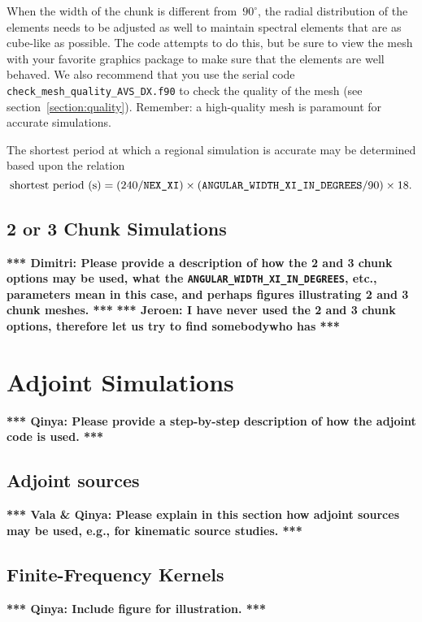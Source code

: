\documentclass[onecolumn]{article}
\newcommand{\tojeroen}[1]{\textbf{*** Jeroen: #1 ***}}
\newcommand{\tovalaqinya}[1]{\textbf{*** Vala \& Qinya: #1 ***}}
\newcommand{\toqinya}[1]{\textbf{*** Qinya: #1 ***}}
\newcommand{\todimitri}[1]{\textbf{*** Dimitri: #1 ***}}
\newcommand{\nexxi}{\mbox{\texttt{NEX\_XI}}}
\begin{document}
When the width of the chunk is different from~$90^\circ$, the radial
distribution of the elements needs to be adjusted as well to maintain
spectral elements that are as cube-like as possible. The code attempts
to do this, but be sure to view the mesh with your favorite graphics
package to make sure that the elements are well behaved.
We also recommend that you use the serial code
\texttt{check\_mesh\_quality\_AVS\_DX.f90} to check the quality of the mesh
(see section~\ref{section:quality}). Remember: a high-quality mesh
is paramount for accurate simulations.

The shortest period at which a regional simulation is accurate may be determined based
upon the relation
\begin{equation}
\mbox{shortest period (s)} = (240/\nexxi)\times
(\texttt{ANGULAR\_WIDTH\_XI\_IN\_DEGREES}/90)\times 18.
\label{eq:shortest_period_regional}
\end{equation}

\subsection{2 or 3 Chunk Simulations}

\todimitri{Please provide a description of how the 2 and 3 chunk options may be used,
what the \texttt{ANGULAR\_WIDTH\_XI\_IN\_DEGREES}, etc., parameters mean
in this case, and perhaps figures illustrating 2 and 3 chunk meshes.}
\tojeroen{I have never used the 2 and 3 chunk options, therefore let us try to find somebodywho has}

\section{Adjoint Simulations}

\toqinya{Please provide a step-by-step description of how the adjoint code
is used.}

\subsection{Adjoint sources}

\tovalaqinya{Please explain in this section how adjoint sources may be used,
e.g., for kinematic source studies.}

\subsection{Finite-Frequency Kernels}

\toqinya{Include figure for illustration.}
\end{document}
